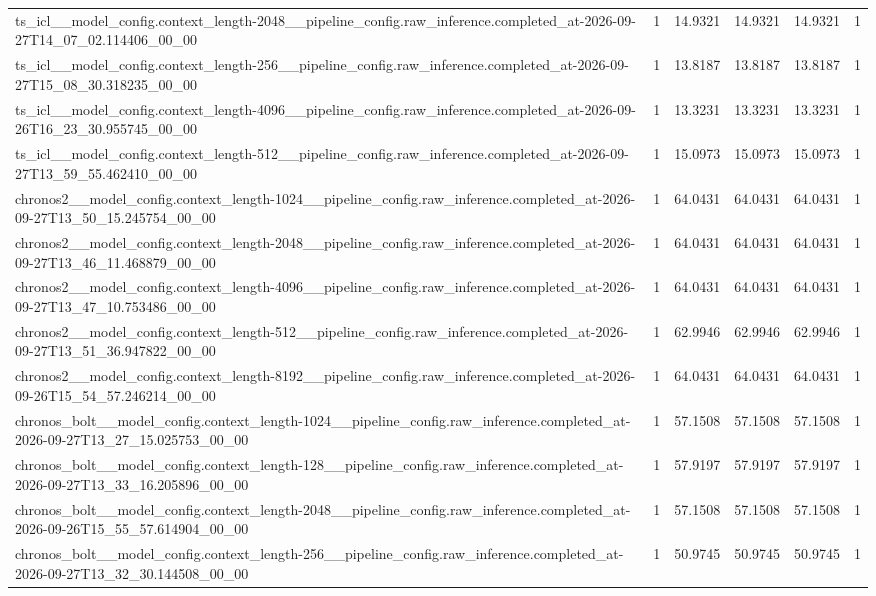 \begin{tabular}{llllll}
ts\_icl\_\_model\_config.context\_length-2048\_\_pipeline\_config.raw\_inference.completed\_at-2026-09-27T14\_07\_02.114406\_00\_00 & 1 & 14.9321 & 14.9321 & 14.9321 & 1 \\
ts\_icl\_\_model\_config.context\_length-256\_\_pipeline\_config.raw\_inference.completed\_at-2026-09-27T15\_08\_30.318235\_00\_00 & 1 & 13.8187 & 13.8187 & 13.8187 & 1 \\
ts\_icl\_\_model\_config.context\_length-4096\_\_pipeline\_config.raw\_inference.completed\_at-2026-09-26T16\_23\_30.955745\_00\_00 & 1 & 13.3231 & 13.3231 & 13.3231 & 1 \\
ts\_icl\_\_model\_config.context\_length-512\_\_pipeline\_config.raw\_inference.completed\_at-2026-09-27T13\_59\_55.462410\_00\_00 & 1 & 15.0973 & 15.0973 & 15.0973 & 1 \\
chronos2\_\_model\_config.context\_length-1024\_\_pipeline\_config.raw\_inference.completed\_at-2026-09-27T13\_50\_15.245754\_00\_00 & 1 & 64.0431 & 64.0431 & 64.0431 & 1 \\
chronos2\_\_model\_config.context\_length-2048\_\_pipeline\_config.raw\_inference.completed\_at-2026-09-27T13\_46\_11.468879\_00\_00 & 1 & 64.0431 & 64.0431 & 64.0431 & 1 \\
chronos2\_\_model\_config.context\_length-4096\_\_pipeline\_config.raw\_inference.completed\_at-2026-09-27T13\_47\_10.753486\_00\_00 & 1 & 64.0431 & 64.0431 & 64.0431 & 1 \\
chronos2\_\_model\_config.context\_length-512\_\_pipeline\_config.raw\_inference.completed\_at-2026-09-27T13\_51\_36.947822\_00\_00 & 1 & 62.9946 & 62.9946 & 62.9946 & 1 \\
chronos2\_\_model\_config.context\_length-8192\_\_pipeline\_config.raw\_inference.completed\_at-2026-09-26T15\_54\_57.246214\_00\_00 & 1 & 64.0431 & 64.0431 & 64.0431 & 1 \\
chronos\_bolt\_\_model\_config.context\_length-1024\_\_pipeline\_config.raw\_inference.completed\_at-2026-09-27T13\_27\_15.025753\_00\_00 & 1 & 57.1508 & 57.1508 & 57.1508 & 1 \\
chronos\_bolt\_\_model\_config.context\_length-128\_\_pipeline\_config.raw\_inference.completed\_at-2026-09-27T13\_33\_16.205896\_00\_00 & 1 & 57.9197 & 57.9197 & 57.9197 & 1 \\
chronos\_bolt\_\_model\_config.context\_length-2048\_\_pipeline\_config.raw\_inference.completed\_at-2026-09-26T15\_55\_57.614904\_00\_00 & 1 & 57.1508 & 57.1508 & 57.1508 & 1 \\
chronos\_bolt\_\_model\_config.context\_length-256\_\_pipeline\_config.raw\_inference.completed\_at-2026-09-27T13\_32\_30.144508\_00\_00 & 1 & 50.9745 & 50.9745 & 50.9745 & 1 \\

\end{tabular}
